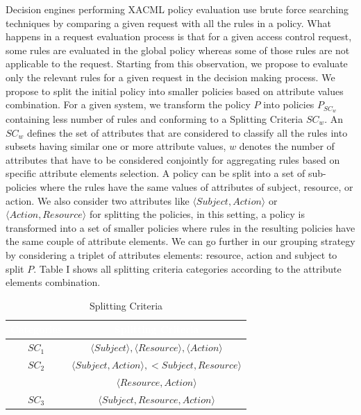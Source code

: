 Decision engines performing XACML policy evaluation use brute force searching techniques by comparing a given request with all the rules in a policy. 
What happens in a request evaluation process is that for a given access control request, some rules are evaluated in the global policy whereas some of those rules are not
 applicable to the request. Starting from this observation, we propose to evaluate only the relevant rules for a given request in the decision making process. 
We propose to split the initial policy into smaller policies based on attribute values combination. For a given system, we transform the policy \normalsize $P$ into 
policies \normalsize $P_{SC_{w}}$ containing less number of rules and conforming to a Splitting Criteria $SC_{w}$. An $SC_{w}$ defines the set of attributes that are considered 
to classify all the rules into subsets having similar one or more attribute values, $w$ denotes the number of attributes that have to be considered conjointly for aggregating 
rules based on specific attribute elements selection. A policy can be split into a set of sub-policies where the rules have the same values of attributes of subject, resource, or 
action. We also consider two attributes like $\langle Subject, Action\rangle$ or $\langle Action, Resource\rangle$ for splitting the policies, in this setting, a policy is transformed into a set of smaller 
policies where rules in the resulting policies have the same couple of attribute elements. We can go further in our grouping strategy by considering a triplet of attributes
elements: resource, action and subject to split \normalsize $P$. Table I shows all splitting criteria categories according to the attribute elements combination.
\begin{table}[h!]
\centering
\setlength{\extrarowheight}{6 pt}
\begin{tabular}{|>{\small}c|>{\small}c|} 
\hline  \rowcolor{black} 
\bf
\textcolor{white}{Categories}& \bf \textcolor{white}{Splitting Criteria}\\ \hline
$SC_{1}$& {$\langle Subject \rangle, \langle Resource\rangle, \langle Action\rangle$}\\ \hline
$SC_{2}$& {$\langle Subject,Action \rangle, <Subject,Resource\rangle$}\\&{$\langle Resource,Action\rangle$}\\  \hline
$SC_{3}$& {$\langle Subject,Resource,Action\rangle$}\\ \hline
\end{tabular}
\caption{Splitting Criteria}
\label{table1}\end{table}



